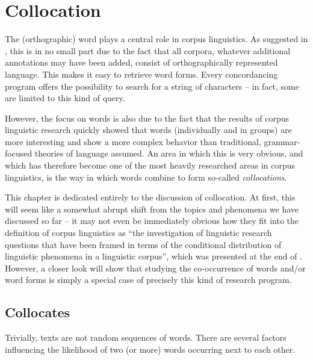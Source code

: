 \chapter{Collocation}
\label{ch:collocation}

The (orthographic) word plays a central role in corpus linguistics. As suggested in , this is in no small part due to the fact that all corpora, whatever additional annotations  may have been added, consist of orthographically represented language. This makes it easy to retrieve  word forms. Every concordancing  program offers the possibility to search for a string of characters -- in fact, some are limited to this kind of  query.

However, the focus on words is also due to the fact that the results of corpus linguistic research quickly showed that words (individually and in groups) are more interesting and show a more complex behavior than traditional, grammar\hyp{}focused  theories of language assumed. An area in which this is very obvious, and which has therefore become one of the most heavily researched areas in corpus linguistics, is the way in which words combine to form so\hyp{}called  \textit{collocations}.

This chapter is dedicated entirely to the discussion of collocation.  At first, this will seem like a somewhat abrupt shift from the topics and phenomena we have discussed so far -- it may not even be immediately obvious how they fit into the definition of corpus linguistics as ``the investigation of linguistic research questions that have been framed in terms of the conditional distribution  of linguistic phenomena in a linguistic corpus'', which was presented at the end of . However, a closer look will show that studying the co\hyp{}occurrence of words and\slash or word forms is simply a special case of precisely this kind of research program.

\section{Collocates}
\label{sec:collocates}

Trivially, texts are not random  sequences of words. There are several factors influencing the likelihood  of two (or more) words occurring next to each other.

